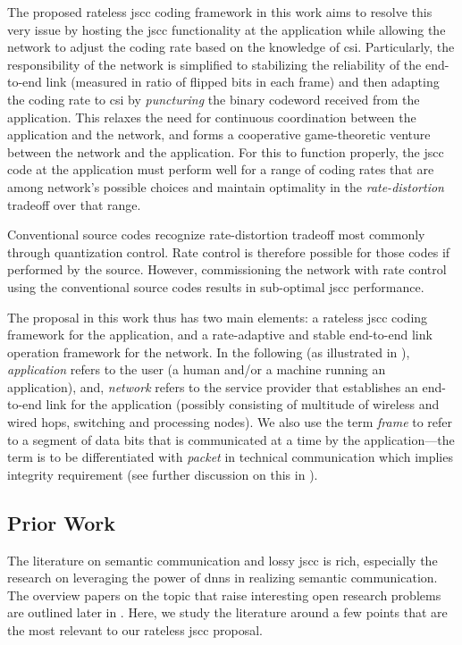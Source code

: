 The proposed rateless \gls{jscc} coding framework in this work  aims to resolve this very issue by hosting the \gls{jscc} functionality at the application while allowing the network to adjust the coding rate based on the knowledge of \gls{csi}. Particularly, the responsibility of the network is simplified to stabilizing the reliability of the end-to-end link (measured in ratio of flipped bits in each frame) and then adapting the coding rate to \gls{csi} by \emph{puncturing} the binary codeword received from the application. This relaxes the need for continuous coordination between the application and the network, and forms a cooperative game-theoretic venture between the network and the application. For this to function properly, the \gls{jscc} code at the application must perform well for a range of coding rates that are among network's possible choices and maintain optimality in the \emph{rate-distortion} tradeoff over that range.

Conventional source codes recognize rate-distortion tradeoff most commonly through quantization control. Rate control is therefore possible for those codes if performed by the source. However, commissioning the network with  rate control using the conventional source codes results in sub-optimal \gls{jscc} performance. 


The proposal in this work thus has two main elements: a rateless \gls{jscc} coding framework for the application, and a rate-adaptive and stable end-to-end link operation framework for the network. In the following (as illustrated in  ),  \emph{application} refers to the user (a human and/or a machine running an application), and,  \emph{network}  refers to the service provider that establishes an end-to-end link for the application (possibly consisting of multitude of wireless and wired hops, switching and processing nodes). We also use the term \emph{frame} to refer to a segment of data bits that is communicated at a time by the application---the term is to be differentiated with \emph{packet} in technical communication which implies integrity requirement (see further discussion on this in ). 





\subsection{Prior Work}
\label{sec:priorwork}

The literature on semantic communication and lossy \gls{jscc} is rich, especially the research on leveraging the power of \glspl{dnn} in realizing semantic communication. The overview papers on the topic that raise interesting open research problems are outlined later in . Here, we study the literature around a few  points that are the most relevant to our rateless \gls{jscc} proposal.


